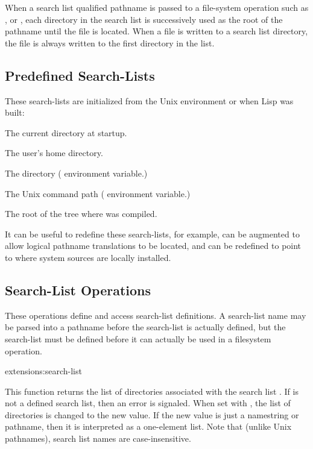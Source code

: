 When a search list qualified pathname is passed to a file-system operation such
as ,  or , each directory in the search
list is successively used as the root of the pathname until the file is
located.  When a file is written to a search list directory, the file is always
written to the first directory in the list.


\subsection{Predefined Search-Lists}

These search-lists are initialized from the Unix environment or when Lisp was
built:
\begin{Lentry}
\item[\code{default:}] The current directory at startup.

\item[\code{home:}] The user's home directory.

\item[\code{library:}] The \cmucl{}  directory ( environment
variable.)

\item[\code{path:}] The Unix command path ( environment variable.)

\item[\code{target:}] The root of the tree where \cmucl{} was compiled.
\end{Lentry}
It can be useful to redefine these search-lists, for example, 
can be augmented to allow logical pathname translations to be located, and
 can be redefined to point to where \cmucl{} system sources are
locally installed. 


\subsection{Search-List Operations}

These operations define and access search-list definitions.  A search-list name
may be parsed into a pathname before the search-list is actually defined, but
the search-list must be defined before it can actually be used in a filesystem
operation.

\begin{defun}{extensions:}{search-list}{}
  
  This function returns the list of directories associated with the
  search list .  If  is not a defined search list,
  then an error is signaled.  When set with , the list of
  directories is changed to the new value.  If the new value is just a
  namestring or pathname, then it is interpreted as a one-element
  list.  Note that (unlike Unix pathnames), search list names are
  case-insensitive.
\end{defun}

